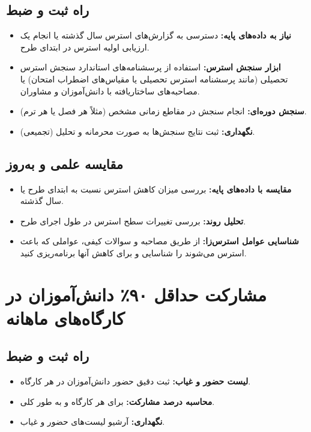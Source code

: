 \documentclass[12pt,a4paper]{article}
\begin{document}
\subsection*{راه ثبت و ضبط}
\begin{itemize}
    \item \textbf{نیاز به داده‌های پایه:} دسترسی به گزارش‌های استرس سال گذشته یا انجام یک ارزیابی اولیه استرس در ابتدای طرح.
    \item \textbf{ابزار سنجش استرس:} استفاده از پرسشنامه‌های استاندارد سنجش استرس تحصیلی (مانند پرسشنامه استرس تحصیلی یا مقیاس‌های اضطراب امتحان) یا مصاحبه‌های ساختاریافته با دانش‌آموزان و مشاوران.
    \item \textbf{سنجش دوره‌ای:} انجام سنجش در مقاطع زمانی مشخص (مثلاً هر فصل یا هر ترم).
    \item \textbf{نگهداری:} ثبت نتایج سنجش‌ها به صورت محرمانه و تحلیل  (تجمیعی).
\end{itemize}

\subsection*{مقایسه علمی و به‌روز}
\begin{itemize}
    \item \textbf{مقایسه با داده‌های پایه:} بررسی میزان کاهش استرس نسبت به ابتدای طرح یا سال گذشته.
    \item \textbf{تحلیل روند:} بررسی تغییرات سطح استرس در طول اجرای طرح.
    \item \textbf{شناسایی عوامل استرس‌زا:} از طریق مصاحبه و سوالات کیفی، عواملی که باعث استرس می‌شوند را شناسایی و برای کاهش آنها برنامه‌ریزی کنید.
\end{itemize}

\section{مشارکت حداقل ۹۰٪ دانش‌آموزان در کارگاه‌های ماهانه}

\subsection*{راه ثبت و ضبط}
\begin{itemize}
    \item \textbf{لیست حضور و غیاب:} ثبت دقیق حضور دانش‌آموزان در هر کارگاه.
    \item \textbf{محاسبه درصد مشارکت:} برای هر کارگاه و به طور کلی.
    \item \textbf{نگهداری:} آرشیو لیست‌های حضور و غیاب.
\end{itemize}
\end{document}
